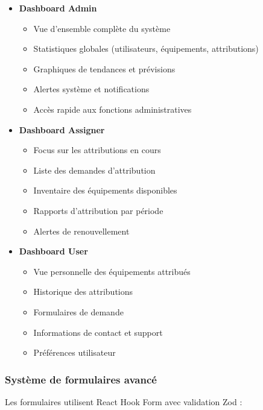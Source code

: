 \documentclass[12pt,a4paper]{report}
\begin{document}
\begin{itemize}
\item \textbf{Dashboard Admin}
  \begin{itemize}
  \item Vue d'ensemble complète du système
  \item Statistiques globales (utilisateurs, équipements, attributions)
  \item Graphiques de tendances et prévisions
  \item Alertes système et notifications
  \item Accès rapide aux fonctions administratives
  \end{itemize}

\item \textbf{Dashboard Assigner}
  \begin{itemize}
  \item Focus sur les attributions en cours
  \item Liste des demandes d'attribution
  \item Inventaire des équipements disponibles
  \item Rapports d'attribution par période
  \item Alertes de renouvellement
  \end{itemize}

\item \textbf{Dashboard User}
  \begin{itemize}
  \item Vue personnelle des équipements attribués
  \item Historique des attributions
  \item Formulaires de demande
  \item Informations de contact et support
  \item Préférences utilisateur
  \end{itemize}
\end{itemize}

\subsubsection{Système de formulaires avancé}
Les formulaires utilisent React Hook Form avec validation Zod :
\end{document}
